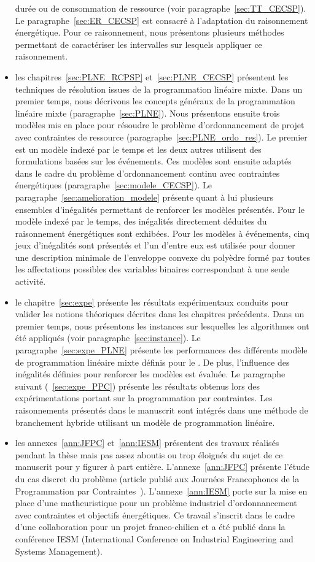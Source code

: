 \begin{itemize}
  durée ou de consommation de ressource (voir
  paragraphe~\ref{sec:TT_CECSP}). Le paragraphe~\ref{sec:ER_CECSP} est
  consacré à l'adaptation du raisonnement énergétique. Pour ce
  raisonnement, nous présentons plusieurs méthodes permettant de
  caractériser les intervalles sur lesquels appliquer ce raisonnement.
\item les chapitres~\ref{sec:PLNE_RCPSP} et~\ref{sec:PLNE_CECSP}
  présentent les techniques de résolution issues de la programmation
  linéaire mixte. Dans un premier temps, nous décrivons les concepts généraux
  de la programmation linéaire mixte (paragraphe~\ref{sec:PLNE}). Nous
  présentons ensuite trois modèles mis en place pour
  résoudre le problème d'ordonnancement de projet avec contraintes de
  ressource (paragraphe~\ref{sec:PLNE_ordo_res}). Le premier est un
  modèle indexé par le temps et les deux autres utilisent des
  formulations basées sur les événements. Ces modèles sont
  ensuite adaptés dans le cadre du problème d'ordonnancement continu
avec contraintes énergétiques (paragraphe~\ref{sec:modele_CECSP}). Le
paragraphe~\ref{sec:amelioration_modele} présente quant à lui plusieurs
ensembles d'inégalités permettant de renforcer les modèles
présentés. Pour le modèle indexé par le temps, des inégalités
directement déduites du raisonnement énergétiques sont exhibées. Pour
les modèles à événements, cinq jeux d'inégalités sont présentés et
l'un d'entre eux est utilisée pour donner une description minimale de
l'enveloppe convexe du polyèdre formé par toutes les affectations
possibles des variables binaires correspondant à une seule activité.
\item le chapitre~\ref{sec:expe} présente les résultats expérimentaux
  conduits pour valider les notions théoriques décrites dans les
  chapitres précédents. Dans un premier temps, nous présentons les
  instances sur lesquelles les algorithmes ont été appliqués (voir
  paragraphe~\ref{sec:instance}). Le paragraphe~\ref{sec:expe_PLNE}
  présente les performances des différents modèle de programmation
  linéaire mixte définis pour le \CECSP. De plus, l'influence des 
  inégalités définies pour renforcer les modèles est évaluée. Le
  paragraphe suivant (~\ref{sec:expe_PPC}) présente les résultats obtenus
  lors des expérimentations portant sur la programmation par
  contraintes. Les raisonnements présentés dans le manuscrit sont
  intégrés dans une méthode de branchement hybride utilisant un modèle
  de programmation linéaire.  
\item les annexes~\ref{ann:JFPC} et~\ref{ann:IESM} présentent des
  travaux réalisés pendant la thèse mais pas assez aboutis ou trop
  éloignés du sujet de ce manuscrit pour y figurer à part entière.
  L'annexe~\ref{ann:JFPC} présente l'étude du cas discret du problème
  (article publié aux Journées Francophones de la Programmation par
  Contraintes~\cite{Nattaf_JFPC}). L'annexe~\ref{ann:IESM} porte sur
  la mise en place d'une matheuristique pour un problème industriel
  d'ordonnancement avec contraintes et objectifs énergétiques. Ce
  travail s'inscrit dans le cadre d'une collaboration pour un projet
  franco-chilien et a été publié dans la conférence IESM (International
  Conference on Industrial Engineering and Systems Management).
\end{itemize}











